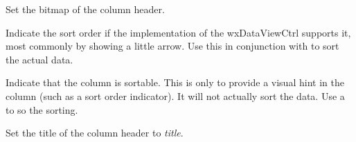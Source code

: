 Set the bitmap of the column header.

\label{wxdataviewcolumnsetsortorder}


Indicate the sort order if the implementation of the
wxDataViewCtrl supports it, most commonly by showing
a little arrow. Use this in conjunction with 
to sort the actual data.

\label{wxdataviewcolumnsetsortable}


Indicate that the column is sortable. This is only to provide a
visual hint in the column (such as a sort order indicator). It
will not actually sort the data. Use a 
to so the sorting.

\label{wxdataviewcolumnsettitle}


Set the title of the column header to {\it title}.

